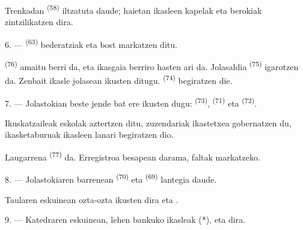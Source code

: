 Trenkadan  \textsuperscript{(58)} iltzatuta daude; haietan
ikasleen kapelak eta berokiak zintzilikatzen dira.

\VUsaut{5.2mm}
\VUsaut{3.6mm}

6. ---  \textsuperscript{(63)} bederatziak eta bost markatzen
ditu.

 \textsuperscript{(76)} amaitu berri da, eta ikasgaia berriro
hasten ari da. Jolasaldia  \textsuperscript{(75)} igarotzen
da. Zenbait ikasle jolasean ikusten ditugu. 
\textsuperscript{(74)} begiratzen die.

7. --- Jolastokian beste jende bat ere ikusten dugu: 
\textsuperscript{(73)},  \textsuperscript{(71)} eta
 \textsuperscript{(72)}.

Ikuskatzaileak eskolak aztertzen ditu, zuzendariak ikastetxea gobernatzen du,
ikasketaburuak ikasleen lanari begiratzen dio.

Laugarrena  \textsuperscript{(77)} da. Erregistroa besapean
darama, faltak markatzeko.

8. --- Jolastokiaren barrenean  \textsuperscript{(70)}
eta  \textsuperscript{(69)} lantegia daude.

Taularen eskuinean ozta-ozta ikusten dira  eta
 .


\VUsaut{2.4mm}

\VUsaut{3.0mm}

9. --- Katedraren eskuinean, lehen bankuko ikasleak  (*),
 eta  dira.

